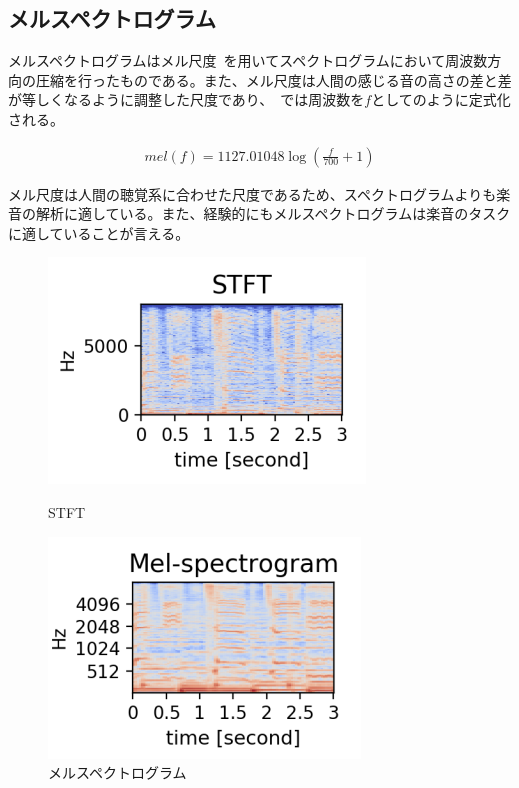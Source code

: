 \subsection{メルスペクトログラム}

メルスペクトログラムはメル尺度~\cite{melscale}を用いてスペクトログラムにおいて周波数方向の圧縮を行ったものである。また、メル尺度は人間の感じる音の高さの差と差が等しくなるように調整した尺度であり、~\cite{mel}では周波数を$f$としてのように定式化される。

\begin{align}
    \label{eq:mel}
    mel(f)=1127.01048\log{(\frac{f}{700}+1)}
\end{align}

メル尺度は人間の聴覚系に合わせた尺度であるため、スペクトログラムよりも楽音の解析に適している。また、経験的にもメルスペクトログラムは楽音のタスクに適していることが言える。%

\begin{figure}[b]
\centering
\begin{minipage}{0.48\columnwidth}
\centering
\includegraphics[width=\columnwidth]{figure/stft.png}
\caption{STFT}
\label{fig:STFT}
\end{minipage}
\begin{minipage}{0.48\columnwidth}
\centering
\includegraphics[width=\columnwidth]{figure/mel.png}
\caption{メルスペクトログラム}
\label{fig:mel}
\end{minipage}
\end{figure}

